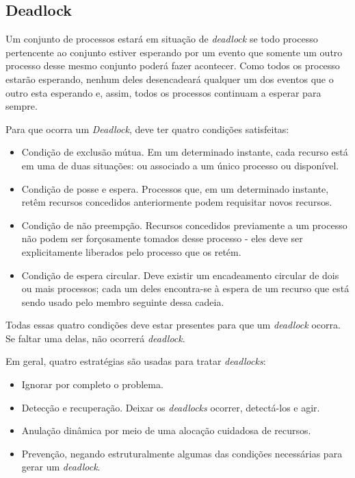 \subsection{Deadlock}

Um conjunto de processos estará em situação de \textit{deadlock} se todo processo pertencente ao conjunto 
estiver esperando por um evento que somente um outro processo desse mesmo conjunto poderá fazer 
acontecer. Como todos os processo estarão esperando, nenhum deles desencadeará qualquer um dos 
eventos que o outro esta esperando e, assim, todos os processos continuam a esperar para sempre.

Para que ocorra um \textit{Deadlock}, deve ter quatro condições satisfeitas:

\begin{itemize}
\item Condição de exclusão mútua. Em um determinado instante, cada recurso está em uma de duas situações:
ou associado a um único processo ou disponível.
\item Condição de posse e espera. Processos que, em um determinado instante, retêm recursos concedidos
anteriormente podem requisitar novos recursos.
\item Condição de não preempção. Recursos concedidos previamente a um processo não podem ser 
forçosamente tomados desse processo - eles deve ser explicitamente liberados pelo processo que os retém.
\item Condição de espera circular. Deve existir um encadeamento circular de dois ou mais processos; cada um
deles encontra-se à espera de um recurso que está sendo usado pelo membro seguinte dessa cadeia.
\end{itemize}

Todas essas quatro condições deve estar presentes para que um \textit{deadlock} ocorra. Se faltar
uma delas, não ocorrerá \textit{deadlock}.

Em geral, quatro estratégias são usadas para tratar \textit{deadlocks}:

\begin{itemize}
\item Ignorar por completo o problema.
\item Detecção e recuperação. Deixar os \textit{deadlocks} ocorrer, detectá-los e agir.
\item Anulação dinâmica por meio de uma alocação cuidadosa de recursos.
\item Prevenção, negando estruturalmente algumas das condições necessárias para gerar um \textit{deadlock}.
\end{itemize}

